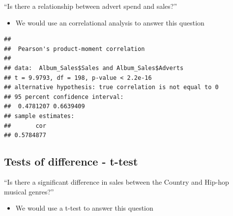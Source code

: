 \documentclass[
]{book}
\newenvironment{Shaded}{\begin{snugshade}}{\end{snugshade}}
\newcommand{\KeywordTok}[1]{\textcolor[rgb]{0.13,0.29,0.53}{\textbf{#1}}}
\newcommand{\NormalTok}[1]{#1}
\newcommand{\OperatorTok}[1]{\textcolor[rgb]{0.81,0.36,0.00}{\textbf{#1}}}
\newcommand{\StringTok}[1]{\textcolor[rgb]{0.31,0.60,0.02}{#1}}
\providecommand{\tightlist}{%
  \setlength{\itemsep}{0pt}\setlength{\parskip}{0pt}}
\begin{document}
``Is there a relationship between advert spend and sales?''

\begin{itemize}
\tightlist
\item
  We would use an correlational analysis to answer this question
\end{itemize}

\begin{Shaded}
\end{Shaded}

\begin{verbatim}
## 
##  Pearson's product-moment correlation
## 
## data:  Album_Sales$Sales and Album_Sales$Adverts
## t = 9.9793, df = 198, p-value < 2.2e-16
## alternative hypothesis: true correlation is not equal to 0
## 95 percent confidence interval:
##  0.4781207 0.6639409
## sample estimates:
##       cor 
## 0.5784877
\end{verbatim}

\hypertarget{tests-of-difference---t-test}{%
\subsection{Tests of difference - t-test}\label{tests-of-difference---t-test}}

``Is there a significant difference in sales between the Country and Hip-hop musical genres?''

\begin{itemize}
\tightlist
\item
  We would use a t-test to answer this question
\end{itemize}

\begin{Shaded}
\end{Shaded}
\end{document}
